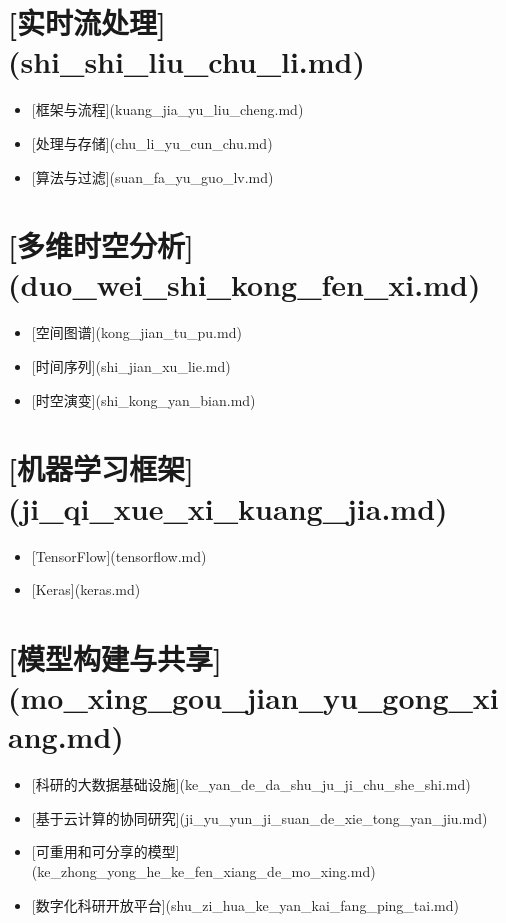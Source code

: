 \documentclass[letterpaper,10pt,english]{sphinxmanual}
\begin{document}
\chapter{{[}实时流处理{]}(shi\_shi\_liu\_chu\_li.md)}
\label{index:shi-shi-liu-chu-li-md}\begin{itemize}
\item {} 
{[}框架与流程{]}(kuang\_jia\_yu\_liu\_cheng.md)

\item {} 
{[}处理与存储{]}(chu\_li\_yu\_cun\_chu.md)

\item {} 
{[}算法与过滤{]}(suan\_fa\_yu\_guo\_lv.md)

\end{itemize}


\chapter{{[}多维时空分析{]}(duo\_wei\_shi\_kong\_fen\_xi.md)}
\label{index:duo-wei-shi-kong-fen-xi-md}\begin{itemize}
\item {} 
{[}空间图谱{]}(kong\_jian\_tu\_pu.md)

\item {} 
{[}时间序列{]}(shi\_jian\_xu\_lie.md)

\item {} 
{[}时空演变{]}(shi\_kong\_yan\_bian.md)

\end{itemize}


\chapter{{[}机器学习框架{]}(ji\_qi\_xue\_xi\_kuang\_jia.md)}
\label{index:ji-qi-xue-xi-kuang-jia-md}\begin{itemize}
\item {} 
{[}TensorFlow{]}(tensorflow.md)

\item {} 
{[}Keras{]}(keras.md)

\end{itemize}


\chapter{{[}模型构建与共享{]}(mo\_xing\_gou\_jian\_yu\_gong\_xiang.md)}
\label{index:mo-xing-gou-jian-yu-gong-xiang-md}\begin{itemize}
\item {} 
{[}科研的大数据基础设施{]}(ke\_yan\_de\_da\_shu\_ju\_ji\_chu\_she\_shi.md)

\item {} 
{[}基于云计算的协同研究{]}(ji\_yu\_yun\_ji\_suan\_de\_xie\_tong\_yan\_jiu.md)

\item {} 
{[}可重用和可分享的模型{]}(ke\_zhong\_yong\_he\_ke\_fen\_xiang\_de\_mo\_xing.md)

\item {} 
{[}数字化科研开放平台{]}(shu\_zi\_hua\_ke\_yan\_kai\_fang\_ping\_tai.md)

\end{itemize}
\end{document}
